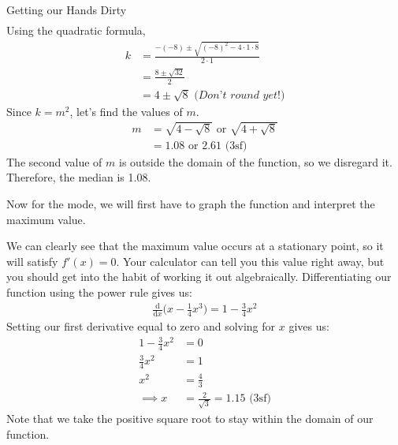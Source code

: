 \documentclass[../../main.tex]{subfiles}
\begin{document}
\begin{example}{Getting our Hands Dirty}
\begin{align}
\end{align}
Using the quadratic formula,
\begin{align}
    k &= \frac{-(-8) \pm \sqrt{(-8)^2 - 4\cdot1\cdot8}}{2 \cdot 1} \\
    &= \frac{8 \pm \sqrt{32}}{2} \\
    &= 4 \pm \sqrt{8} \textit{ (Don't round yet!)}
\end{align}
Since $k = m^2$, let's find the values of $m$.
\begin{align}
    m &= \sqrt{4 - \sqrt{8}} \text{ or } \sqrt{4 + \sqrt{8}} \\
    &= 1.08 \text{ or } 2.61 \text{ (3sf)}
\end{align}
The second value of $m$ is outside the domain of the function, so we disregard it. Therefore, the median is 1.08.

Now for the mode, we will first have to graph the function and interpret the maximum value.
\begin{center}
\end{center}
We can clearly see that the maximum value occurs at a stationary point, so it will satisfy $f'(x) = 0$. Your calculator can tell you this value right away, but you should get into the habit of working it out algebraically. Differentiating our function using the power rule gives us:
\begin{align}
    \frac{\mathrm d}{\mathrm dx}\Big(x - \frac{1}{4}x^3\Big) = 1 - \frac{3}{4}x^2
\end{align}
Setting our first derivative equal to zero and solving for $x$ gives us:
\begin{align}
    1 - \frac{3}{4}x^2 &= 0 \\
    \frac{3}{4}x^2 &= 1 \\
    x^2 &= \frac{4}{3} \\
    \implies x &= \frac{2}{\sqrt{3}} = 1.15 \text{ (3sf)}
\end{align}
Note that we take the positive square root to stay within the domain of our function.
\end{example}
\end{document}
